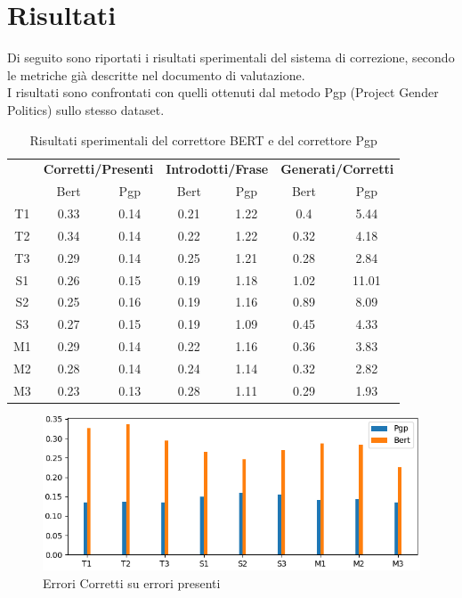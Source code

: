\documentclass[12pt]{article}
\begin{document}
\section{Risultati}

Di seguito sono riportati i risultati sperimentali del sistema di correzione, secondo le metriche già descritte nel documento di valutazione.\\
I risultati sono confrontati con quelli ottenuti dal metodo Pgp (Project Gender Politics) sullo stesso dataset.

\begin{table}[H]
\centering
\begin{tabular}{c|cc|cc|cc}
& \multicolumn{2}{c}{\textbf{Corretti/Presenti}} & \multicolumn{2}{c}{\textbf{Introdotti/Frase}} & \multicolumn{2}{c}{\textbf{Generati/Corretti}} \\
& Bert & Pgp & Bert & Pgp & Bert & Pgp \\ \hline
T1 & 0.33 & 0.14 & 0.21 & 1.22 & 0.4 & 5.44 \\
T2 & 0.34 & 0.14 & 0.22 & 1.22 & 0.32 & 4.18 \\
T3 & 0.29 & 0.14 & 0.25 & 1.21 & 0.28 & 2.84 \\
S1 & 0.26 & 0.15 & 0.19 & 1.18 & 1.02 & 11.01 \\
S2 & 0.25 & 0.16 & 0.19 & 1.16 & 0.89 & 8.09 \\
S3 & 0.27 & 0.15 & 0.19 & 1.09 & 0.45 & 4.33 \\
M1 & 0.29 & 0.14 & 0.22 & 1.16 & 0.36 & 3.83 \\
M2 & 0.28 & 0.14 & 0.24 & 1.14 & 0.32 & 2.82 \\
M3 & 0.23 & 0.13 & 0.28 & 1.11 & 0.29 & 1.93 \\
\end{tabular}
\caption{Risultati sperimentali del correttore BERT e del correttore Pgp}
\end{table}

\begin{figure}[H]
\includegraphics[width=\textwidth]{immagini/cpp}
\caption{Errori Corretti su errori presenti}
\end{figure}
\end{document}
